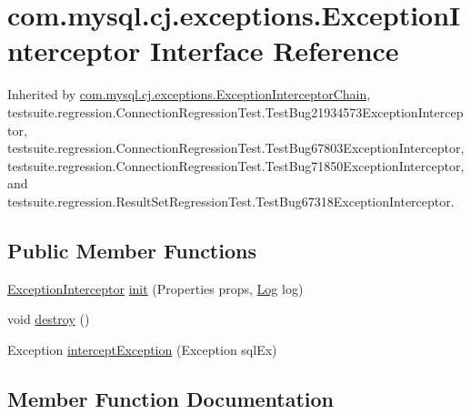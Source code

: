 \hypertarget{interfacecom_1_1mysql_1_1cj_1_1exceptions_1_1_exception_interceptor}{}\section{com.\+mysql.\+cj.\+exceptions.\+Exception\+Interceptor Interface Reference}
\label{interfacecom_1_1mysql_1_1cj_1_1exceptions_1_1_exception_interceptor}


Inherited by \mbox{\hyperlink{classcom_1_1mysql_1_1cj_1_1exceptions_1_1_exception_interceptor_chain}{com.\+mysql.\+cj.\+exceptions.\+Exception\+Interceptor\+Chain}}, testsuite.\+regression.\+Connection\+Regression\+Test.\+Test\+Bug21934573\+Exception\+Interceptor, testsuite.\+regression.\+Connection\+Regression\+Test.\+Test\+Bug67803\+Exception\+Interceptor, testsuite.\+regression.\+Connection\+Regression\+Test.\+Test\+Bug71850\+Exception\+Interceptor, and testsuite.\+regression.\+Result\+Set\+Regression\+Test.\+Test\+Bug67318\+Exception\+Interceptor.

\subsection*{Public Member Functions}
\begin{DoxyCompactItemize}
\item 
\mbox{\hyperlink{interfacecom_1_1mysql_1_1cj_1_1exceptions_1_1_exception_interceptor}{Exception\+Interceptor}} \mbox{\hyperlink{interfacecom_1_1mysql_1_1cj_1_1exceptions_1_1_exception_interceptor_a5488d80601434446f3f5f73c27226417}{init}} (Properties props, \mbox{\hyperlink{interfacecom_1_1mysql_1_1cj_1_1log_1_1_log}{Log}} log)
\item 
void \mbox{\hyperlink{interfacecom_1_1mysql_1_1cj_1_1exceptions_1_1_exception_interceptor_a225145c1c4b2c7e2d20cfd0bc4e1d332}{destroy}} ()
\item 
Exception \mbox{\hyperlink{interfacecom_1_1mysql_1_1cj_1_1exceptions_1_1_exception_interceptor_ab77cba0ffef1d2d6921d29e2eb79b072}{intercept\+Exception}} (Exception sql\+Ex)
\end{DoxyCompactItemize}


\subsection{Member Function Documentation}
\mbox{\label{interfacecom_1_1mysql_1_1cj_1_1exceptions_1_1_exception_interceptor_a225145c1c4b2c7e2d20cfd0bc4e1d332}} 
